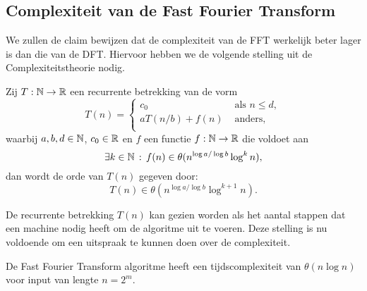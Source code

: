 \subsection{Complexiteit van de Fast Fourier Transform}
We zullen de claim bewijzen dat de complexiteit van de FFT werkelijk beter lager is dan die van de DFT.
Hiervoor hebben we de volgende stelling uit de Complexiteitstheorie nodig.
\begin{stelling}
\label{akra}
    Zij $T:\mathbb{N}\to\mathbb{R}$ een recurrente betrekking van de vorm
    \[
    T(n) = \begin{cases}
      c_0 &\text{ als } n \leq d, \\
      a T(n/b) + f(n) &\text{ anders,} \\
    \end{cases}
    \]
    waarbij $a,b,d\in\mathbb{N}$, $c_0\in\mathbb{R}$ en $f$ een functie $f:\mathbb{N}\rightarrow\mathbb{R}$ die voldoet aan 
    \[
    \exists k \in \mathbb{N} \,:\, f(n) \in \theta(n^{\log a/\log b} \log^k n),
    \]
    dan wordt de orde van $T(n)$ gegeven door:
    \[
      T(n) \in \theta(n^{\log a / \log b} \log^{k+1}n).
    \]
\end{stelling}
De recurrente betrekking $T(n)$ kan gezien worden als het aantal stappen dat een machine nodig heeft om de algoritme uit te voeren.
Deze stelling is nu voldoende om een uitspraak te kunnen doen over de complexiteit.
\begin{stelling}
  De Fast Fourier Transform algoritme heeft een tijdscomplexiteit van $\theta(n\log n)$ voor input van lengte $n=2^m$.
\end{stelling} 
